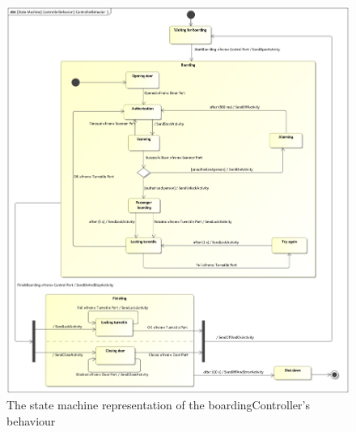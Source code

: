 \documentclass[a4paper]{article}
\begin{document}
\begin{figure}
	\includegraphics[width=\textwidth]{stm-ControllerBehavior.jpg}
	\caption{The state machine representation of the
		\gls{boardingController}'s behaviour}%
	\label{fig:stm-ControllerBehavior}
\end{figure}
\end{document}
